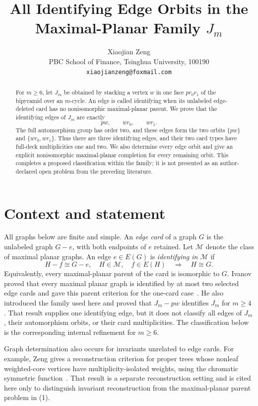 \documentclass[11pt]{article}
\title{All Identifying Edge Orbits in the Maximal-Planar Family $J_m$}
\author{Xiaojian Zeng\\
PBC School of Finance, Tsinghua University, 100190\\
\texttt{xiaojianzeng@foxmail.com}}
\date{}
\newcommand{\cM}{\mathcal M}
\begin{document}
\maketitle

\begin{abstract}
For $m\geq6$, let $J_m$ be obtained by stacking a vertex $w$ in one
face $pr_0r_1$ of the bipyramid over an $m$-cycle.  An edge is called
identifying when its unlabeled edge-deleted card has no nonisomorphic
maximal-planar parent.  We prove that the identifying edges of $J_m$ are
exactly
\[
  pw,\qquad wr_0,\qquad wr_1.
\]
The full automorphism group has order two, and these edges form the two
orbits $\{pw\}$ and $\{wr_0,wr_1\}$.  Thus there are three identifying
edges, and their two card types have full-deck multiplicities one and two.
We also determine every edge orbit and give an explicit nonisomorphic
maximal-planar completion for every remaining orbit.  This completes a
proposed classification within the family; it is not presented as an
author-declared open problem from the preceding literature.
\end{abstract}

\section{Context and statement}

All graphs below are finite and simple.  An \emph{edge card} of a graph $G$
is the unlabeled graph $G-e$, with both endpoints of $e$ retained.  Let
$\cM$ denote the class of maximal planar graphs.  An edge $e\in E(G)$ is
\emph{identifying in $\cM$} if
\[
 H-f\cong G-e,\quad H\in\cM,\quad f\in E(H)
 \quad\Longrightarrow\quad H\cong G.                 \tag{1}
\]
Equivalently, every maximal-planar parent of the card is isomorphic to
$G$.  Ivanov proved that every maximal planar graph is identified by at
most two selected edge cards and gave this parent criterion for the
one-card case~\cite{Ivanov2026}.  He also introduced the family used here
and proved that $J_m-pw$ identifies $J_m$ for $m\geq4$
\cite[Proposition~5.2]{Ivanov2026}.  That result supplies one identifying
edge, but it does not classify all edges of $J_m$, their automorphism
orbits, or their card multiplicities.  The classification below is the
corresponding internal refinement for $m\geq6$.

Graph determination also occurs for invariants unrelated to edge cards.
For example, Zeng gives a reconstruction criterion for proper trees whose
nonleaf weighted-core vertices have multiplicity-isolated weights, using
the chromatic symmetric function~\cite{Zeng2026Multiplicity}.  That result
is a separate reconstruction setting and is cited here only to distinguish
invariant reconstruction from the maximal-planar parent problem in (1).
\end{document}
